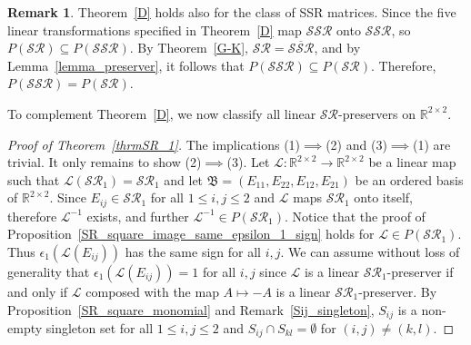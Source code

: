 \documentclass[11pt,reqno]{amsart}
\theoremstyle{plain}
\theoremstyle{definition}
\newtheorem{rem}[theorem]{Remark}
\numberwithin{equation}{section}
\begin{document}
\begin{rem}\label{SSR_proof}
	Theorem~\ref{D} holds also for the class of SSR matrices. Since the five linear transformations specified in Theorem~\ref{D} map $\mathcal{SSR}$ onto $\mathcal{SSR}$, so $P(\mathcal{SR})\subseteq P(\mathcal{SSR})$. By Theorem~\ref{G-K}, $\mathcal{SR}=\overline{\mathcal{SSR}}$, and by Lemma~\ref{lemma_preserver}, it follows that $P(\mathcal{SSR})\subseteq P(\mathcal{SR})$. Therefore, $P(\mathcal{SSR})=P(\mathcal{SR})$.
\end{rem}

To complement Theorem~\ref{D}, we now classify all linear $\mathcal{SR}$-preservers on $\mathbb{R}^{2\times2}$.

\begin{proof}[Proof of Theorem~\ref{thrmSR_1}]
	The implications (1)$\implies$(2) and (3)$\implies$(1) are trivial. It only remains to show (2)$\implies$(3). Let $\mathcal{L}:\mathbb{R}^{2\times2}\to\mathbb{R}^{2\times2}$ be a linear map such that $\mathcal{L}(\mathcal{SR}_1)=\mathcal{SR}_1$ and let $\mathfrak{B}=(E_{11},E_{22},E_{12},E_{21})$ be an ordered basis of $\mathbb{R}^{2\times2}$. Since $E_{ij}\in\mathcal{SR}_1$ for all $1\leq i,j\leq2$ and $\mathcal{L}$ maps $\mathcal{SR}_1$ onto itself, therefore $\mathcal{L}^{-1}$ exists, and further $\mathcal{L}^{-1}\in P(\mathcal{SR}_1)$. Notice that the proof of Proposition~\ref{SR_square_image_same_epsilon_1_sign} holds for $\mathcal{L}\in P(\mathcal{SR}_1)$. Thus $\epsilon_1(\mathcal{L}(E_{ij}))$ has the same sign for all $i,j$. We can assume without loss of generality that $\epsilon_1(\mathcal{L}(E_{ij}))=1$ for all $i,j$ since $\mathcal{L}$ is a linear $\mathcal{SR}_1$-preserver if and only if $\mathcal{L}$ composed with the map $A\mapsto-A$ is a linear $\mathcal{SR}_1$-preserver. By Proposition~\ref{SR_square_monomial} and Remark~\ref{Sij_singleton}, $S_{ij}$ is a non-empty singleton set for all $1\leq i,j\leq 2$ and $S_{ij}\cap S_{kl}=\emptyset$ for $(i,j)\neq(k,l)$.  
	

\end{proof}
\end{document}
